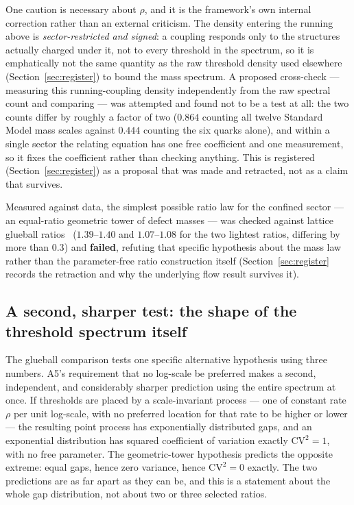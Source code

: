 \documentclass[aps,prd,twocolumn,superscriptaddress,nofootinbib]{revtex4-2}
\begin{document}
One caution is necessary about $\rho$, and it is the framework's own
internal correction rather than an external criticism. The density
entering the running above is \emph{sector-restricted and signed}: a
coupling responds only to the structures actually charged under it, not
to every threshold in the spectrum, so it is emphatically not the same
quantity as the raw threshold density used elsewhere
(Section~\ref{sec:register}) to bound the mass spectrum. A proposed
cross-check — measuring this running-coupling density independently from
the raw spectral count and comparing — was attempted and found not to be
a test at all: the two counts differ by roughly a factor of two ($0.864$
counting all twelve Standard Model mass scales against $0.444$ counting
the six quarks alone), and within a single sector the relating equation
has one free coefficient and one measurement, so it fixes the
coefficient rather than checking anything. This is registered
(Section~\ref{sec:register}) as a proposal that was made and retracted,
not as a claim that survives.

Measured against data, the simplest possible ratio law for the confined
sector — an equal-ratio geometric tower of defect masses — was checked
against lattice glueball ratios~\cite{MorningstarPeardon1999} ($1.39$–$1.40$ and $1.07$–$1.08$ for the
two lightest ratios, differing by more than $0.3$) and
\textbf{failed}, refuting that specific hypothesis about the mass law
rather than the parameter-free ratio construction itself
(Section~\ref{sec:register} records the retraction and why the
underlying flow result survives it).

\subsection{A second, sharper test: the shape of the threshold spectrum itself}

The glueball comparison tests one specific alternative hypothesis using
three numbers. A5's requirement that no log-scale be preferred makes a
second, independent, and considerably sharper prediction using the
entire spectrum at once. If thresholds are placed by a scale-invariant
process — one of constant rate $\rho$ per unit log-scale, with no
preferred location for that rate to be higher or lower — the resulting
point process has exponentially distributed gaps, and an exponential
distribution has squared coefficient of variation exactly
$\mathrm{CV}^2=1$, with no free parameter. The geometric-tower hypothesis
predicts the opposite extreme: equal gaps, hence zero variance, hence
$\mathrm{CV}^2=0$ exactly. The two predictions are as far apart as they
can be, and this is a statement about the whole gap distribution, not
about two or three selected ratios.
\end{document}
